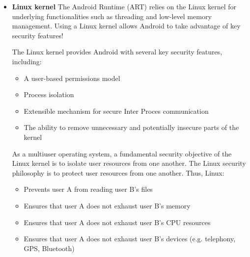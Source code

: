 \begin{itemize}
	\item \textbf{Linux kernel} The Android Runtime (ART) relies on the Linux kernel for underlying functionalities such as threading and low-level memory management.
	Using a Linux kernel allows Android to take advantage of key security features!
	
	The Linux kernel provides Android with several key security features, including:
	
	\begin{itemize}
		\item A user-based permissions model
	\item Process isolation
	\item Extensible mechanism for secure Inter Proces communication
	\item The ability to remove unnecessary and potentially insecure parts of the kernel
	\end{itemize}
	As a multiuser operating system, a fundamental security objective of the Linux kernel is to isolate user resources from one another. The Linux security philosophy is to protect user resources from one another. Thus, Linux:
	
\begin{itemize}
	\item 	Prevents user A from reading user B's files
	\item Ensures that user A does not exhaust user B's memory
	\item Ensures that user A does not exhaust user B's CPU resources
	\item Ensures that user A does not exhaust user B's devices (e.g. telephony, GPS, Bluetooth)
\end{itemize}
	
	
	

\end{itemize}
